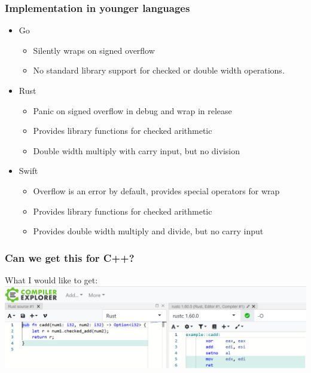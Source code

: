 \documentclass[aspectratio=169]{beamer}
\newif\iftransitions
\begin{document}
\begin{frame}
  \frametitle{Implementation in younger languages}
  
  \begin{itemize}
    \item Go
    \begin{itemize}
      \item Silently wraps on signed overflow
      \item No standard library support for checked or double width operations.
    \end{itemize}  \iftransitions \pause \fi 
    \item Rust
    \begin{itemize}
      \item Panic on signed overflow in debug and wrap in release
      \item Provides library functions for checked arithmetic
      \item Double width multiply with carry input, but no division
    \end{itemize}    \iftransitions \pause \fi 
    \item Swift 
    \begin{itemize}
      \item Overflow is an error by default, provides special operators for wrap
      \item Provides library functions for checked arithmetic
      \item Provides double width multiply and divide, but no carry input
    \end{itemize}
  \end{itemize}

\end{frame}

\begin{frame}
  \frametitle{Can we get this for C++?}

  What I would like to get:
  \includegraphics[width=.95\textwidth]{arithgfx/rust_add.png}
\end{frame}
\end{document}
